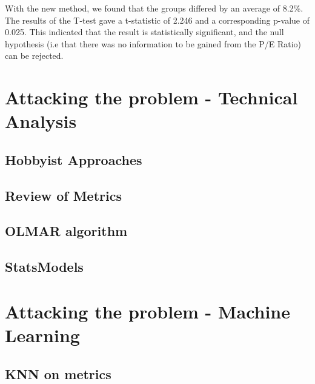 \documentclass{report}
\begin{document}
With the new method, we found that the groups differed by an average of 8.2\%. The results of the T-test gave a t-statistic of 2.246 and a corresponding p-value of 0.025. This indicated that the result is statistically significant, and the null hypothesis (i.e that there was no information to be gained from the P/E Ratio) can be rejected. 

\section{Attacking the problem - Technical Analysis}
\subsection{Hobbyist Approaches}
\subsection{Review of Metrics}
\subsection{OLMAR algorithm}
\subsection{StatsModels}

\section{Attacking the problem - Machine Learning}
\subsection{KNN on metrics}

\cite {website:pybrain-tutorial}



\end{document}
